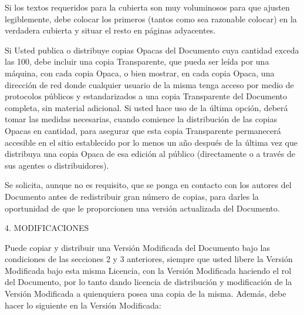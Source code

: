 \documentclass[a4paper, 11pt, oneside]{report}
\begin{document}
Si los textos requeridos para la cubierta son muy voluminosos para que ajusten legiblemente, debe colocar los primeros (tantos como sea razonable colocar) en la verdadera cubierta y situar el resto en páginas adyacentes.

Si Usted publica o distribuye copias Opacas del Documento cuya cantidad exceda las 100, debe incluir una copia Transparente, que pueda ser leída por una máquina, con cada copia Opaca, o bien mostrar, en cada copia Opaca, una dirección de red donde cualquier usuario de la misma tenga acceso por medio de protocolos públicos y estandarizados a una copia Transparente del Documento completa, sin material adicional. Si usted hace uso de la última opción, deberá tomar las medidas necesarias, cuando comience la distribución de las copias Opacas en cantidad, para asegurar que esta copia Transparente permanecerá accesible en el sitio establecido por lo menos un año después de la última vez que distribuya una copia Opaca de esa edición al público (directamente o a través de sus agentes o distribuidores).

Se solicita, aunque no es requisito, que se ponga en contacto con los autores del Documento antes de redistribuir gran número de copias, para darles la oportunidad de que le proporcionen una versión actualizada del Documento.

4. MODIFICACIONES

Puede copiar y distribuir una Versión Modificada del Documento bajo las condiciones de las secciones 2 y 3 anteriores, siempre que usted libere la Versión Modificada bajo esta misma Licencia, con la Versión Modificada haciendo el rol del Documento, por lo tanto dando licencia de distribución y modificación de la Versión Modificada a quienquiera posea una copia de la misma. Además, debe hacer lo siguiente en la Versión Modificada:
\end{document}
